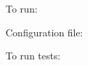 To run\+:


\begin{DoxyCode}{0}

\end{DoxyCode}


Configuration file\+:


\begin{DoxyCode}{0}

\end{DoxyCode}


To run tests\+:


\begin{DoxyCode}{0}

\end{DoxyCode}
 